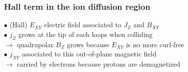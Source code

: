 \documentclass{beamer}
\newcommand{\D}{{\mathrm d}}
\begin{document}



\begin{frame}
\frametitle{Hall term in the ion diffusion region}

\begin{center}

\end{center}

$\bullet$ (Hall) $E_{XY}$ electric field associated to $J_Z$ and $B_{XY}$ \\[0.3cm]
$\bullet$ $j_Z$ grows at the tip of each loops when colliding\\
$\to$ quadrupolar $B_Z$ grows because $E_{XY}$ is no more curl-free\\[0.3cm]
$\bullet$ $j_{XY}$ associated to this out-of-plane magnetic field\\
$\to$ carried by electrons because protons are demagnetized

\end{frame}
\end{document}
